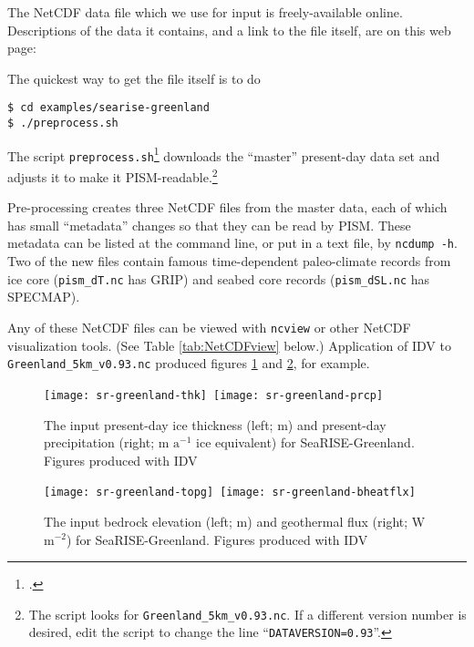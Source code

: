 The NetCDF data file which we use for input is freely-available online.  Descriptions of the data it contains, and a link to the file itself, are on this web page: 
\medskip

\centerline{}
\medskip

\noindent The quickest way to get the file itself is to do
\begin{verbatim}
$ cd examples/searise-greenland
$ ./preprocess.sh
\end{verbatim}
\noindent The script \texttt{preprocess.sh}\footnote{.} downloads the ``master'' present-day data set and adjusts it to make it PISM-readable.\footnote{The script looks for \texttt{Greenland\_5km\_v0.93.nc}.  If a different version number is desired, edit the script to change the line ``\texttt{DATAVERSION=0.93}''.}

Pre-processing creates three NetCDF files from the master data, each of which has small ``metadata'' changes so that they can be read by PISM.  These metadata can be listed at the command line, or put in a text file, by \texttt{ncdump -h}.  Two of the new files contain famous time-dependent paleo-climate records from ice core (\texttt{pism_dT.nc} has GRIP) and seabed core records (\texttt{pism_dSL.nc} has SPECMAP).

Any of these NetCDF files can be viewed with \texttt{ncview} or other NetCDF visualization tools.  (See Table \ref{tab:NetCDFview} below.)  Application of IDV to \texttt{Greenland_5km_v0.93.nc} produced figures \ref{fig:sr-input1} and  \ref{fig:sr-input2}, for example.

\begin{figure}[ht]
\centering
\mbox{\texttt{[image: sr-greenland-thk]}
 \qquad\qquad\texttt{[image: sr-greenland-prcp]}}
\caption{The input present-day ice thickness (left; m) and present-day precipitation (right; m $\text{a}^{-1}$ ice equivalent) for SeaRISE-Greenland.  Figures produced with IDV}
\label{fig:sr-input1}
\end{figure}

\begin{figure}[ht]
\centering
\mbox{\texttt{[image: sr-greenland-topg]}
 \qquad\quad \texttt{[image: sr-greenland-bheatflx]}}
\caption{The input bedrock elevation (left; m) and geothermal flux (right; W $\text{m}^{-2}$) for SeaRISE-Greenland.  Figures produced with IDV}
\label{fig:sr-input2}
\end{figure}


